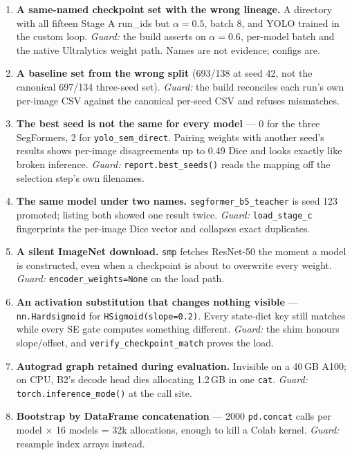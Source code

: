 \documentclass[11pt]{article}
\begin{document}
\begin{enumerate}[leftmargin=*,itemsep=3pt]
\item \textbf{A same-named checkpoint set with the wrong lineage.} A directory
with all fifteen Stage A run\_ids but $\alpha=0.5$, batch 8, and YOLO trained in
the custom loop. \emph{Guard:} the build asserts on $\alpha=0.6$, per-model batch
and the native Ultralytics weight path. Names are not evidence; configs are.

\item \textbf{A baseline set from the wrong split} (693/138 at seed 42, not the
canonical 697/134 three-seed set). \emph{Guard:} the build reconciles each run's
own per-image CSV against the canonical per-seed CSV and refuses mismatches.

\item \textbf{The best seed is not the same for every model} --- 0 for the three
SegFormers, 2 for \texttt{yolo\_sem\_direct}. Pairing weights with another seed's
results shows per-image disagreements up to 0.49 Dice and looks exactly like
broken inference. \emph{Guard:} \texttt{report.best\_seeds()} reads the mapping
off the selection step's own filenames.

\item \textbf{The same model under two names.} \texttt{segformer\_b5\_teacher} is
seed 123 promoted; listing both showed one result twice. \emph{Guard:}
\texttt{load\_stage\_c} fingerprints the per-image Dice vector and collapses exact
duplicates.

\item \textbf{A silent ImageNet download.} \texttt{smp} fetches ResNet-50 the
moment a model is constructed, even when a checkpoint is about to overwrite every
weight. \emph{Guard:} \texttt{encoder\_weights=None} on the load path.

\item \textbf{An activation substitution that changes nothing visible} ---
\texttt{nn.Hardsigmoid} for \texttt{HSigmoid(slope=0.2)}. Every state-dict key
still matches while every SE gate computes something different. \emph{Guard:}
the shim honours slope/offset, and \texttt{verify\_checkpoint\_match} proves the
load.

\item \textbf{Autograd graph retained during evaluation.} Invisible on a 40\,GB
A100; on CPU, B2's decode head dies allocating 1.2\,GB in one \texttt{cat}.
\emph{Guard:} \texttt{torch.inference\_mode()} at the call site.

\item \textbf{Bootstrap by DataFrame concatenation} --- 2000 \texttt{pd.concat}
calls per model $\times$ 16 models = 32k allocations, enough to kill a Colab
kernel. \emph{Guard:} resample index arrays instead.


\end{enumerate}
\end{document}
